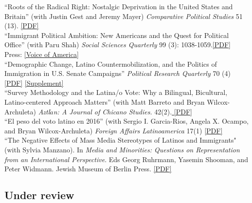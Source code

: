 \documentclass[11pt, a4paper]{article}
\newcommand{\years}[1]{\marginnote{\scriptsize #1}}
\begin{document}
\years{} ``Roots of the Radical Right: Nostalgic Deprivation in the United States and Britain'' (with Justin Gest and Jeremy Mayer) \textit{Comparative Political Studies} 51 (13). \href{http://tylerreny.github.io/pdf/pubs/reny_2017_cps_final.pdf}{[PDF]}\\

\years{} ``Immigrant Political Ambition:  New Americans and the Quest for Political Office'' (with Paru Shah) \textit{Social Sciences Quarterly} 99 (3): 1038-1059.\href{http://tylerreny.github.io/pdf/pubs/reny_shah_2018_ssq_immigrant_ambition.pdf}{[PDF]} Press: \href{https://www.voanews.com/a/immigrants-candidates-make-a-run-for-it-in-upcoming-us-elections/4439132.html}{[Voice of America]}\\

\years{2017}``Demographic Change, Latino Countermobilization, and the Politics of Immigration in U.S. Senate Campaigns'' \textit{Political Research Quarterly} 70 (4) \href{http://tylerreny.github.io/pdf/pubs/reny_2017_prq_final.pdf}{[PDF]} \href{http://tylerreny.github.io/pdf/pubs/reny_2017_prq_final_supp.pdf}{[Supplement]}\\

\years{}``Survey Methodology and the Latina/o Vote: Why a Bilingual, Bicultural, Latino-centered Approach Matters'' (with Matt Barreto and Bryan Wilcox-Archuleta) \textit{Aztl$\acute{a}$n: A Journal of Chicano Studies.} 42(2).\href{http://tylerreny.github.io/pdf/pubs/reny_2017_aztlan_final.pdf}{ [PDF]}\\

\years{}``El peso del voto latino en 2016'' (with Sergio I. Garcia-Rios, Angela X. Ocampo, and Bryan Wilcox-Archuleta) \textit{Foreign Affairs Latinoamerica} 17(1) \href{http://tylerreny.github.io/pdf/pubs/reny_et_al_2017_foreign_affairs.pdf}{ [PDF]}\\

\years{2016}``The Negative Effects of Mass Media Stereotypes of Latinos and Immigrants" (with Sylvia Manzano). In \textit{Media and Minorities: Questions on Representation from an International Perspective}. Eds Georg Ruhrmann, Yasemin Shooman, and Peter Widmann. Jewish Museum of Berlin Press. \href{http://tylerreny.github.io/pdf/pubs/reny_manzano_stereotypes_2016.pdf}{[PDF]}\\

\subsection*{Under review}
\end{document}

